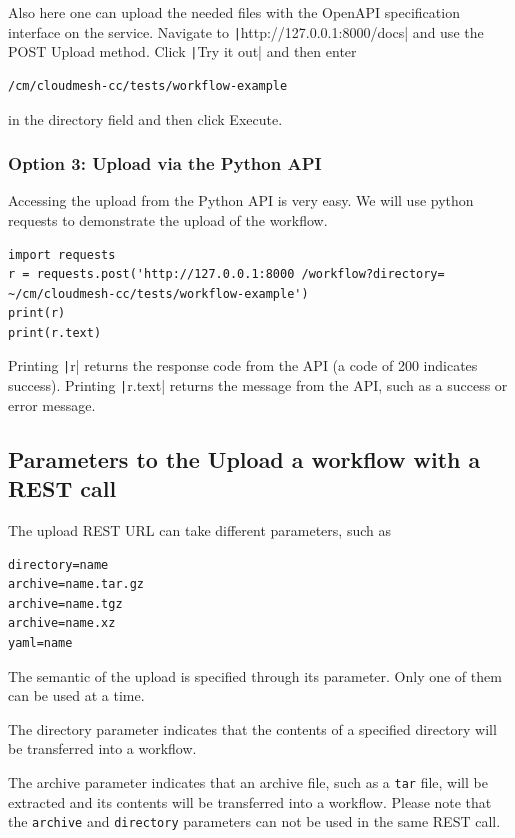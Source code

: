 Also here one can upload the needed files with the OpenAPI specification
interface on the service. Navigate to
\texttt|http://127.0.0.1:8000/docs| and use the POST Upload method. 
Click \texttt|Try it out| and then enter

\begin{verbatim}
/cm/cloudmesh-cc/tests/workflow-example
\end{verbatim}

in the
directory field and then click Execute.

\subsubsection{Option 3: Upload via the Python
API}\label{option-3-upload-via-the-python-api-1}

Accessing the upload from the Python API is very easy. We will use
python requests to demonstrate the upload of the workflow.

\smallskip
\begin{verbatim}
import requests
r = requests.post('http://127.0.0.1:8000 /workflow?directory= ~/cm/cloudmesh-cc/tests/workflow-example')
print(r)
print(r.text)
\end{verbatim}
\smallskip

Printing \texttt|r| returns the response code from the API (a code of
200 indicates success). Printing \texttt|r.text| returns the message
from the API, such as a success or error message.

\subsection{Parameters to the Upload a workflow with a REST
call}\label{parameters-to-the-upload-a-workflow-with-a-rest-call}

The upload REST URL can take different parameters, such as

\begin{verbatim}
directory=name
archive=name.tar.gz
archive=name.tgz
archive=name.xz
yaml=name
\end{verbatim}

The semantic of the upload is specified through its parameter. Only one
of them can be used at a time.

The directory parameter indicates that the contents of a specified
directory will be transferred into a workflow.

The archive parameter indicates that an archive file, such as a
\texttt{tar} file, will be extracted and its contents will be
transferred into a workflow. Please note that the \texttt{archive} and
\texttt{directory} parameters can not be used in the same REST call.

